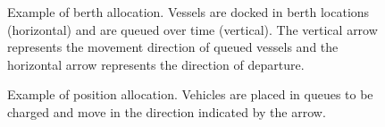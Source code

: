 \documentclass[utf8]{FrontiersinHarvard}
\begin{document}
\begin{subfigures}
    \begin{figure}[htpb]
    \centering
        
        \caption{Example of berth allocation. Vessels are docked in berth locations (horizontal) and are queued over
          time (vertical). The vertical arrow represents the movement direction of queued vessels and the horizontal
          arrow represents the direction of departure.}
        \label{subfig:bapexample}
    \end{figure}
    \hfill

    \begin{figure}[htpb]
    \centering
        
        \caption{Example of position allocation. Vehicles are placed in queues to be charged and move in the direction
          indicated by the arrow.}
        \label{subfig:papexample}
    \end{figure}
\end{subfigures}
\end{document}

